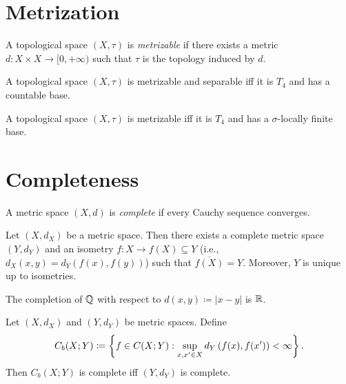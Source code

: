 \documentclass[screen,single]{techreport}
\numberwithin{equation}{section}
\begin{document}
\section{Metrization}

\begin{definition}\label{De:Metrizable}
  A topological space $(X,\tau)$ is \emph{metrizable} if there exists a metric $d : X \times X \to [0,+\infty)$ such that $\tau$ is the topology induced by $d$.
\end{definition}

\begin{theorem}\label{The:UrysohnMetrization}
  A topological space $(X,\tau)$ is metrizable and separable iff it is $T_4$ and has a countable base.
\end{theorem}

\begin{theorem}\label{The:NagataSmirnov}
  A topological space $(X,\tau)$ is metrizable iff it is $T_4$ and has a $\sigma$-locally finite base.
\end{theorem}

\section{Completeness}

\begin{definition}\label{De:CompleteMetric}
  A metric space $(X,d)$ is \emph{complete} if every Cauchy sequence converges.
\end{definition}

\begin{theorem}\label{De:MetricSpaceCompletion}
  Let $(X,d_X)$ be a metric space.
  Then there exists a complete metric space $(Y,d_Y)$ and an isometry $f : X \to f(X) \subseteq Y$ (i.e., $d_X(x,y) = d_Y(f(x),f(y))$) such that $\overline{f(X)} = Y$.
  Moreover, $Y$ is unique up to isometries.
\end{theorem}

\begin{remark}\label{Rem:CompletionOfQIsR}
  The completion of $\mathbb{Q}$ with respect to $d(x,y) \coloneqq |x-y|$ is $\mathbb{R}$.
\end{remark}

\begin{proposition}\label{Prop:BoundedFunctionSpaceCompeteIffRangeComplete}
  Let $(X,d_X)$ and $(Y,d_Y)$ be metric spaces.
  Define
  \[
  C_b(X;Y) \coloneqq \left\{ { f \in C(X;Y) : \sup_{x,x' \in X} d_Y\left({ f(x), f(x') }\right) < \infty } \right\}.
  \]
  Then $C_b(X;Y)$ is complete iff $(Y,d_Y)$ is complete.
\end{proposition}
\end{document}
